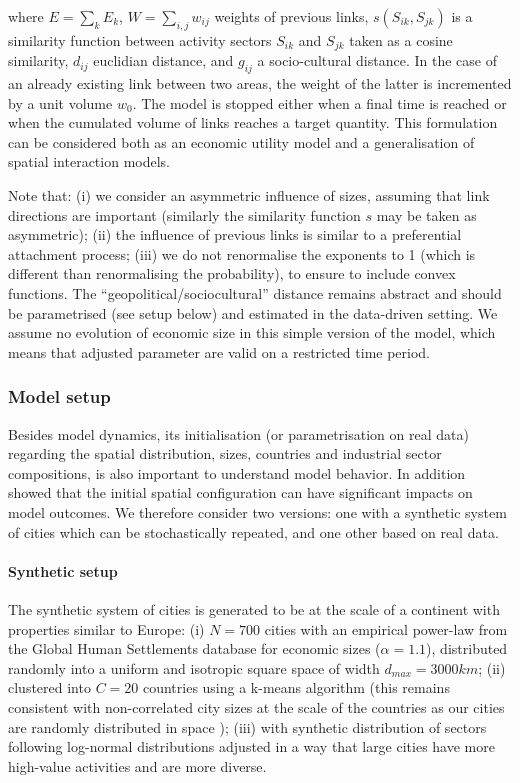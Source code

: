 \documentclass[10pt,letterpaper]{article}
\begin{document}
where $E  =  \sum_k E_k$, $W  = \sum_{i,j} w_{ij}$ weights of previous links, $s(S_{ik},S_{jk})$ is a similarity function between activity sectors $S_{ik}$ and $S_{jk}$ taken as a cosine similarity, $d_{ij}$ euclidian distance, and $g_{ij}$ a socio-cultural distance. In the case of an already existing link between two areas, the weight of the latter is incremented by a unit volume $w_0$. The model is stopped either when a final time is reached or when the cumulated volume of links reaches a target quantity. This formulation can be considered both as an economic utility model and a generalisation of spatial interaction models.



Note that: (i) we consider an asymmetric influence of sizes, assuming that link directions are important (similarly the similarity function $s$ may be taken as asymmetric); (ii) the influence of previous links is similar to a preferential attachment process; (iii) we do not renormalise the exponents to 1 (which is different than renormalising the probability), to ensure to include convex functions. The ``geopolitical/sociocultural'' distance remains abstract and should be parametrised (see setup below) and estimated in the data-driven setting. We assume no evolution of economic size in this simple version of the model, which means that adjusted parameter are valid on a restricted time period.


\subsubsection*{Model setup}

Besides model dynamics, its initialisation (or parametrisation on real data) regarding the spatial distribution, sizes, countries and industrial sector compositions, is also important to understand model behavior. In addition  \cite{raimbault2019space} showed that the initial spatial configuration can have significant impacts on model outcomes. We therefore consider two versions: one with a synthetic system of cities which can be stochastically repeated, and one other based on real data.


\paragraph{Synthetic setup}

The synthetic system of cities is generated to be at the scale of a continent with properties similar to Europe: (i) $N=700$ cities with an empirical power-law from the Global Human Settlements database for economic sizes ($\alpha = 1.1$), distributed randomly into a uniform and isotropic square space of width $d_{max}=3000km$;
(ii) clustered into $C = 20$ countries using a k-means algorithm (this remains consistent with non-correlated city sizes at the scale of the countries as our cities are randomly distributed in space \cite{simini2019testing});
(iii) with synthetic distribution of sectors following log-normal distributions adjusted in a way that large cities have more high-value activities and are more diverse.
\end{document}
